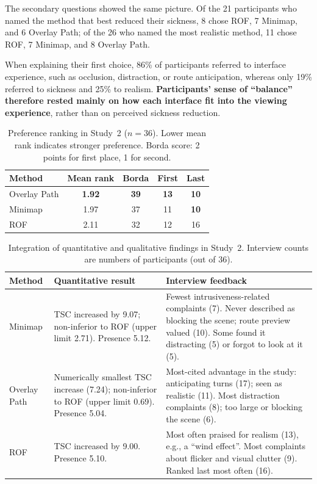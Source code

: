 The secondary questions showed the same picture. Of the 21 participants who
named the method that best reduced their sickness, 8 chose ROF, 7 Minimap,
and 6 Overlay Path; of the 26 who named the most realistic method, 11 chose
ROF, 7 Minimap, and 8 Overlay Path.

When explaining their first choice, 86\% of participants referred to interface
experience, such as occlusion, distraction, or route anticipation, whereas only
19\% referred to sickness and 25\% to realism. \textbf{Participants' sense of
``balance'' therefore rested mainly on how each interface fit into the viewing
experience}, rather than on perceived sickness reduction.

\begin{table}[t]
  \caption{Preference ranking in Study~2 ($n = 36$). Lower mean rank indicates
  stronger preference. Borda score: 2 points for first place, 1 for second.}
  \label{tab:s2-rank}
  \centering
  \footnotesize
  \begin{tabular}{lcccc}
    \toprule
    \textbf{Method} & \textbf{Mean rank} & \textbf{Borda} & \textbf{First} & \textbf{Last} \\
    \midrule
    Overlay Path & \textbf{1.92} & \textbf{39} & \textbf{13} & \textbf{10} \\
    Minimap      & 1.97 & 37 & 11 & \textbf{10} \\
    ROF          & 2.11 & 32 & 12 & 16 \\
    \bottomrule
  \end{tabular}
\end{table}

\begin{table}[t]
  \caption{Integration of quantitative and qualitative findings in Study~2.
  Interview counts are numbers of participants (out of 36).}
  \label{tab:s2-integration}
  \centering
  \footnotesize
  \begin{tabularx}{\textwidth}{lXX}
    \toprule
    \textbf{Method} & \textbf{Quantitative result} & \textbf{Interview feedback} \\
    \midrule
    Minimap      & TSC increased by 9.07; non-inferior to ROF (upper limit 2.71). Presence 5.12. &
                   Fewest intrusiveness-related complaints (7). Never described as blocking the scene; route preview valued (10). Some found it distracting (5) or forgot to look at it (5). \\
    Overlay Path & Numerically smallest TSC increase (7.24); non-inferior to ROF (upper limit 0.69). Presence 5.04. &
                   Most-cited advantage in the study: anticipating turns (17); seen as realistic (11). Most distraction complaints (8); too large or blocking the scene (6). \\
    ROF          & TSC increased by 9.00. Presence 5.10. &
                   Most often praised for realism (13), e.g., a ``wind effect''. Most complaints about flicker and visual clutter (9). Ranked last most often (16). \\
    \bottomrule
  \end{tabularx}
\end{table}

